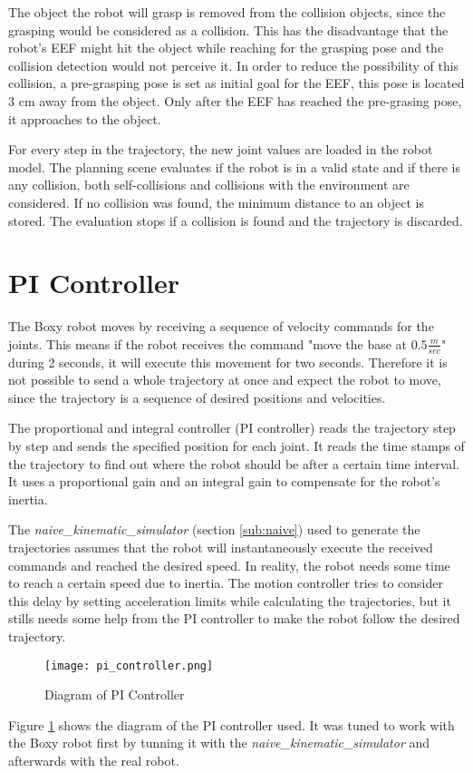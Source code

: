 The object the robot will grasp is removed from the collision objects, since the grasping would be considered as a collision. This has the disadvantage that the robot's EEF might hit the object while reaching for the grasping pose and the collision detection would not perceive it. In order to reduce the possibility of this collision, a pre-grasping pose is set as initial goal for the EEF, this pose is located 3 cm away from the object. Only after the EEF has reached the pre-grasing pose, it approaches to the object.

For every step in the trajectory, the new joint values are loaded in the robot model. The planning scene evaluates if the robot is in a valid state and if there is any collision, both self-collisions and collisions with the environment are considered. If no collision was found, the minimum distance to an object is stored. The evaluation stops if a collision is found and the trajectory is discarded.

\section{PI Controller}

The Boxy robot moves by receiving a sequence of velocity commands for the joints. This means if the robot receives the command "move the base at $0.5\frac{m}{sec}$" during 2 seconds, it will execute this movement for two seconds. Therefore it is not possible to send a whole trajectory at once and expect the robot to move, since the trajectory is a sequence of desired positions and velocities.

The proportional and integral controller (PI controller) reads the trajectory step by step and sends the specified position for each joint. It reads the time stamps of the trajectory to find out where the robot should be after a certain time interval. It uses a proportional gain and an integral gain to compensate for the robot's inertia. 

The \textit{naive\_kinematic\_simulator} (section \ref{sub:naive}) used to generate the trajectories assumes that the robot will instantaneously execute the received commands and reached the desired speed. In reality, the robot needs some time to reach a certain speed due to inertia. The motion controller tries to consider this delay by setting acceleration limits while calculating the trajectories, but it stills needs some help from the PI controller to make the robot follow the desired trajectory.

\begin{figure}[H]
	\centering
	\texttt{[image: pi\_controller.png]}
	\vspace{-10pt}
	\caption{Diagram of PI Controller}
	\vspace{-15pt}
	\label{fig:pi}
\end{figure}

Figure \ref{fig:pi} shows the diagram of the PI controller used. It was tuned to work with the Boxy robot first by tunning it with the \textit{naive\_kinematic\_simulator} and afterwards with the real robot.

